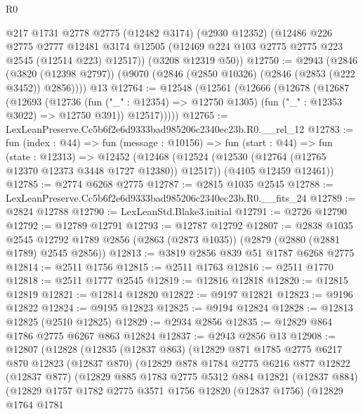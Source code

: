 \begin{lexlean}{R0}
\begin{coremodule}
      @217
      @1731
      @2778
      @2775
      (@12482 @3174)
      (@2930 @12352)
      (@12486
        @226
        @2775
        @2777
        @12481
        @3174
        @12505
        (@12469 @224 @103 @2775 @2775 @223 @2545 (@12514 @223) @12517))
      (@3208 @12319 @50))
@12750 := @2943
    (@2846 (@3820 (@12398 @2797)) (@9070 (@2846 (@2850 @10326) (@2846 (@2853 (@222 @3452)) @2856))))
    @13
@12764 := @12548
    (@12561
      (@12666
        (@12678
          (@12687
            (@12693
              (@12736
                (fun ("_" : @12354) => @12750 @1305)
                (fun ("_" : @12353 @3022) => @12750 @391))
              @12517)))))
@12765 := LexLeanPreserve.Cc5b6f2e6d9333bad985206c2340ec23b.R0.__rel_12
@12783 := fun (index : @44) =>
  fun (message : @10156) =>
  fun (start : @44) =>
  fun (state : @12313) =>
  @12452
    (@12468
      (@12524 (@12530 (@12764 (@12765 @12370 @12373 @3448 @1727 @12380)) @12517))
      (@4105 @12459 @12461))
@12785 := @2774 @6268 @2775
@12787 := @2815 @1035 @2545
@12788 := LexLeanPreserve.Cc5b6f2e6d9333bad985206c2340ec23b.R0.__fits_24
@12789 := @2824 @12788
@12790 := LexLeanStd.Blake3.initial
@12791 := @2726 @12790
@12792 := @12789 @12791
@12793 := @12787 @12792
@12807 := @2838
    @1035
    @2545
    @12792
    @1789
    @2856
    (@2863 (@2873 @1035))
    (@2879 (@2880 (@2881 @1789) @2545 @2856))
@12813 := @3819 @2856 @839 @51 @1787 @6268 @2775
@12814 := @2511 @1756
@12815 := @2511 @1763
@12816 := @2511 @1770
@12818 := @2511 @1777 @2545
@12819 := @12816 @12818
@12820 := @12815 @12819
@12821 := @12814 @12820
@12822 := @9197 @12821
@12823 := @9196 @12822
@12824 := @9195 @12823
@12825 := @9194 @12824
@12828 := @12813 @12825 (@2510 @12825)
@12829 := @2934 @2856
@12835 := @12829 @864 @1786 @2775 @6267 @863 @12824
@12837 := @2943 @2856 @13
@12908 := @12807
    (@12828
      (@12835
        (@12837 @863)
        (@12829
          @871
          @1785
          @2775
          @6217
          @870
          @12823
          (@12837 @870)
          (@12829
            @878
            @1784
            @2775
            @6216
            @877
            @12822
            (@12837 @877)
            (@12829
              @885
              @1783
              @2775
              @5312
              @884
              @12821
              (@12837 @884)
              (@12829
                @1757
                @1782
                @2775
                @3571
                @1756
                @12820
                (@12837 @1756)
                (@12829
                  @1764
                  @1781

\end{coremodule}
\end{lexlean}
